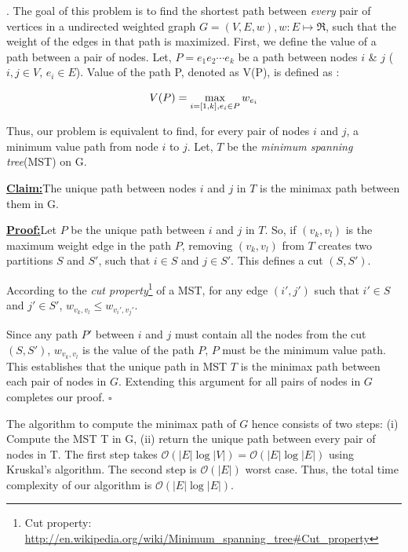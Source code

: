 \documentclass[assign]{article}
\newcommand{\Oo}{\mathcal{O}}
\newenvironment{claim}[1]{\par\noindent\underline{{\bf Claim:}}\space#1}{}
\newenvironment{claimproof}[1]{\par\noindent\underline{{\bf Proof:}}\space#1}{\hfill$\square$}
\begin{document}
.  The goal of this problem is to find the shortest path between {\em every} pair of vertices in a undirected weighted graph $G=(V,E,w), w: E \mapsto \Re$, such that the weight of the edges in that path is maximized. First, we define the value of a path between a pair of nodes. Let, $P = e_1e_2 \cdots e_k$ be a path between nodes $i$ \& $j$ ($i,j \in V$, $e_i \in E$). Value of the path P, denoted as V(P), is defined as :

\begin{equation}
  V(P) = \max_{i=[1,k], e_i \in P} w_{e_i} \notag
\end{equation} 

\noindent Thus, our problem is equivalent to find, for every pair of nodes $i$ and $j$, a minimum value path from node $i$ to $j$. Let, $T$ be the {\em minimum spanning tree}(MST) on G. 

\begin{claim}
  The unique path between nodes $i$ and $j$ in $T$ is the minimax path between them in G.
\end{claim}

\begin{claimproof}
   Let $P$ be the unique path between $i$ and $j$ in $T$. So, if $(v_k,v_l)$ is the maximum weight edge in the path $P$, removing $(v_k,v_l)$ from $T$ creates two partitions $S$ and $S'$, such that $i \in S$ and $j \in S'$. This defines a cut $(S,S')$.

 According to the {\em cut property}\footnote{Cut property: \url{http://en.wikipedia.org/wiki/Minimum_spanning_tree#Cut_property}} of a MST, for any edge $(i',j')$  such that $i' \in S$ and $j' \in S'$, $w_{v_k,v_l} \le w_{v_i',v_j'}$. 
\par Since any path $P'$ between $i$ and $j$ must contain all the nodes from the cut $(S,S')$, $w_{v_k,v_l}$ is the value of the path $P$, $P$ must be the minimum value path. This establishes that the unique path in MST $T$ is the minimax path between each pair of nodes in $G$. Extending this argument for all pairs of nodes in $G$ completes our proof. 
\end{claimproof}

\par The algorithm to compute the minimax path of $G$ hence consists of two steps: (i) Compute the MST T in G, (ii) return the unique path between every pair of nodes in T. The first step takes $\Oo(|E| \log |V|) = \Oo(|E| \log |E|)$ using Kruskal's algorithm. The second step is $\Oo(|E|)$ worst case. Thus, the total time complexity of our algorithm is $\Oo(|E| \log |E|)$.
\end{document}
